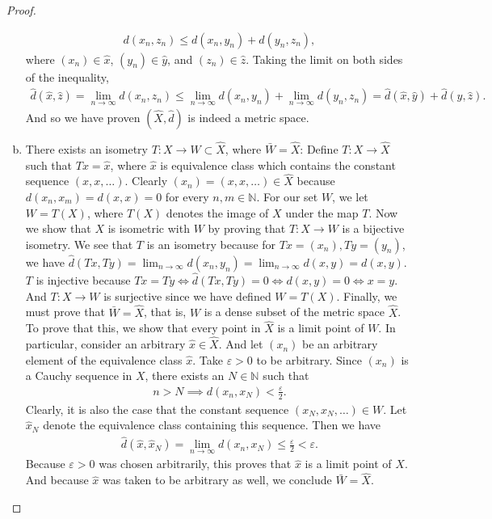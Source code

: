 \documentclass[11pt]{article}
\theoremstyle{mystyle}
\begin{document}
\begin{proof}
\begin{enumerate}[(a)]
\begin{align*}
    d(x_n, z_n) \leq d(x_n, y_n) + d(y_n, z_n),
\end{align*}
where $(x_n) \in \hat{x}$, $(y_n) \in \hat{y}$, and $(z_n) \in \hat{z}$. Taking the limit on both sides of the inequality, 
\begin{align*}
    \hat{d}(\hat{x}, \hat{z}) = \lim_{n \to \infty} d(x_n, z_n) \leq \lim_{n \to \infty} d(x_n, y_n) + \lim_{n \to \infty} d(y_n, z_n) = \hat{d}(\hat{x}, \hat{y}) + \hat{d}(\hat{y}, \hat{z}).
\end{align*}\newline
And so we have proven $(\hat{X}, \hat{d})$ is indeed a metric space.

\item There exists an isometry $T: X \longrightarrow W \subset \hat{X}$, where $\bar{W} = \hat{X}$:\newline
Define $T: X \longrightarrow \hat{X}$ such that $Tx = \hat{x}$, where $\hat{x}$ is equivalence class which contains the constant sequence $(x, x, \ldots)$. Clearly $(x_n) = (x, x, \ldots) \in \hat{X}$ because $d(x_n, x_m) = d(x, x) = 0$ for every $n, m \in \mathbb{N}$. For our set $W$, we let $W = T(X)$, where $T(X)$ denotes the image of $X$ under the map $T$.\newline
Now we show that $X$ is isometric with $W$ by proving that $T: X \longrightarrow W$ is a bijective isometry. We see that $T$ is an isometry because for $Tx = (x_n), Ty = (y_n)$, we have $\hat{d}(Tx, Ty) = \lim_{n \to \infty}d(x_n, y_n) = \lim_{n \to \infty}d(x, y) = d(x, y)$. $T$ is injective because $Tx = Ty \iff \hat{d}(Tx, Ty) = 0 \iff d(x, y) = 0 \iff x=y$. And $T: X \longrightarrow W$ is surjective since we have defined $W = T(X)$.\newline
Finally, we must prove that $\bar{W} = \hat{X}$, that is, $W$ is a dense subset of the metric space $\hat{X}$. To prove that this, we show that every point in $\hat{X}$ is a limit point of $W$. In particular, consider an arbitrary $\hat{x} \in \hat{X}$. And let $(x_n)$ be an arbitrary element of the equivalence class $\hat{x}$. Take $\varepsilon > 0$ to be arbitrary. Since $(x_n)$ is a Cauchy sequence in $X$, there exists an $N \in \mathbb{N}$ such that
\begin{align*}
    n > N \implies d(x_n, x_N) < \frac{\varepsilon}{2}.
\end{align*}
Clearly, it is also the case that the constant sequence $(x_N, x_N, \ldots) \in W$. Let $\hat{x}_N$ denote the equivalence class containing this sequence. Then we have
\begin{align*}
    \hat{d}(\hat{x}, \hat{x}_N) = \lim_{n \to \infty}d(x_n, x_N) \leq \frac{\varepsilon}{2} < \varepsilon.
\end{align*}
Because $\varepsilon > 0$ was chosen arbitrarily, this proves that $\hat{x}$ is a limit point of $X$. And because $\hat{x}$ was taken to be arbitrary as well, we conclude $\bar{W} = \hat{X}$.


\end{enumerate}
\end{proof}
\end{document}
